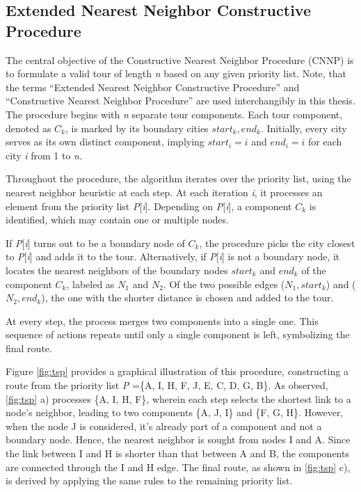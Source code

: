\documentclass[twoside]{ctuthesis}
\theoremstyle{plain}
\theoremstyle{definition}
\theoremstyle{note}
\begin{document}
\subsection{Extended Nearest Neighbor Constructive Procedure}
\label{sec:CNNP}
The central objective of the Constructive Nearest Neighbor Procedure (CNNP) is to formulate a valid tour of length \emph{n} based on any given priority list. Note, that the terms ``Extended Nearest Neighbor Constructive Procedure'' and ``Constructive Nearest Neighbor Procedure'' are used interchangibly in this thesis. The procedure begins with \emph{n} separate tour components. Each tour component, denoted as \emph{$ C_k $}, is marked by its boundary cities \emph{$ start_k, end_k $}. Initially, every city serves as its own distinct component, implying \emph{$ start_i = i $} and \emph{$ end_i = i $} for each city \emph{i} from 1 to \emph{n}.

Throughout the procedure, the algorithm iterates over the priority list, using the nearest neighbor heuristic at each step. At each iteration \emph{i}, it processes an element from the priority list \emph{P}[\emph{i}]. Depending on \emph{P}[\emph{i}], a component \emph{$ C_k $} is identified, which may contain one or multiple nodes.

If \emph{P}[\emph{i}] turns out to be a boundary node of \emph{$ C_k $}, the procedure picks the city closest to \emph{P}[\emph{i}] and adds it to the tour. Alternatively, if \emph{P}[\emph{i}] is not a boundary node, it locates the nearest neighbors of the boundary nodes \emph{$ start_k $} and \emph{$ end_k $} of the component \emph{$ C_k $}, labeled as \emph{$ N_1 $} and \emph{$ N_2 $}. Of the two possible edges (\emph{$ N_1, start_k $}) and (\emph{$ N_2, end_k $}), the one with the shorter distance is chosen and added to the tour.

At every step, the process merges two components into a single one. This sequence of actions repeats until only a single component is left, symbolizing the final route.

Figure \ref{fig:tsp} provides a graphical illustration of this procedure, constructing a route from the priority list \emph{P} =\{A, I, H, F, J, E, C, D, G, B\}. As observed, \ref{fig:tsp} a) processes \{A, I, H, F\}, wherein each step selects the shortest link to a node's neighbor, leading to two components \{A, J, I\} and \{F, G, H\}. However, when the node J is considered, it's already part of a component and not a boundary node. Hence, the nearest neighbor is sought from nodes I and A. Since the link between I and H is shorter than that between A and B, the components are connected through the I and H edge. The final route, as shown in \ref{fig:tsp} c), is derived by applying the same rules to the remaining priority list.
\end{document}
